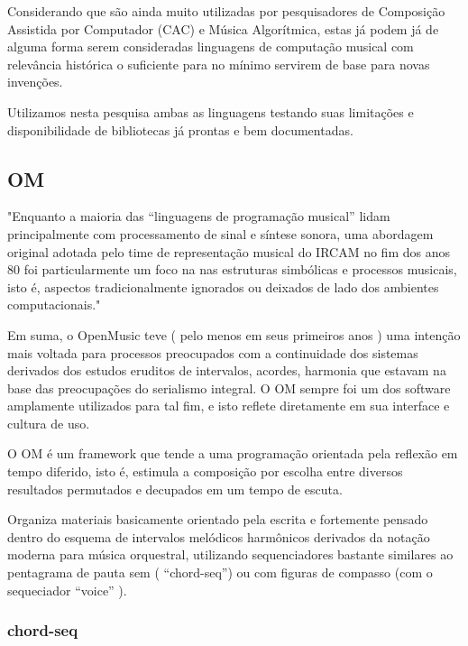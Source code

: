 \documentclass[
	12pt,				%
	openright,			%
	twoside,			%
	a4paper,			%
	english,			%
	french,				%
	spanish,			%
	brazil				%
	]{abntex2}
\begin{document}
Considerando que são ainda muito utilizadas por pesquisadores de Composição Assistida por Computador (CAC) e Música Algorítmica, estas já podem já de alguma forma serem consideradas linguagens de computação musical com relevância histórica o suficiente para no mínimo servirem de base para novas invenções.

Utilizamos nesta pesquisa ambas as linguagens testando suas limitações e disponibilidade de bibliotecas já prontas e bem documentadas. 



\subsection{OM}

\begin{citacao}
"Enquanto a maioria das “linguagens de programação musical” lidam principalmente com processamento de sinal e síntese
sonora, uma abordagem original adotada pelo time de representação musical do IRCAM no fim dos anos 80 foi
particularmente um foco na nas estruturas simbólicas e processos musicais, isto é, aspectos tradicionalmente
ignorados ou deixados de lado dos ambientes computacionais."\cite{bresson2011openmusic}
\end{citacao}

Em suma, o OpenMusic teve ( pelo menos em seus primeiros anos ) uma intenção mais voltada para processos preocupados com a continuidade dos sistemas derivados dos estudos eruditos de intervalos, acordes, harmonia que estavam na base das preocupações do serialismo integral. O OM sempre foi um dos software amplamente utilizados para tal fim, e isto reflete diretamente em sua interface e cultura de uso.

O OM é um framework que tende a uma programação orientada pela reflexão em tempo diferido, isto é, estimula a composição por escolha entre diversos resultados permutados e decupados em um tempo de escuta.

Organiza materiais basicamente orientado pela escrita e fortemente pensado dentro do esquema de intervalos melódicos
harmônicos derivados da notação moderna para música orquestral, utilizando sequenciadores bastante similares ao pentagrama de pauta sem ( “chord-seq”) ou com figuras de compasso (com o sequeciador “voice” ).

\subsubsection{chord-seq}
\end{document}
